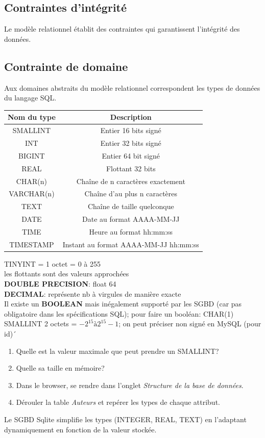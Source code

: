 \documentclass[a4paper,11pt]{article}
\begin{document}
\begin{Form}
\section{Contraintes d'intégrité}
Le modèle relationnel établit des contraintes qui garantissent l'intégrité des données.
\subsection{Contrainte de domaine}
Aux domaines abstraits du modèle relationnel correspondent les types de données du langage SQL.
\begin{center}
\begin{tabular}{|c|c|}
\hline 
\textbf{Nom du type} & \textbf{Description} \\ 
\hline 
SMALLINT & Entier 16 bits signé \\ 
\hline 
INT & Entier 32 bits signé \\ 
\hline 
BIGINT & Entier 64 bit signé \\ 
\hline 
REAL & Flottant 32 bits \\ 
\hline 
CHAR(n) & Chaîne de n caractères exactement \\ 
\hline 
VARCHAR(n) & Chaîne d'au plus n caractères \\ 
\hline 
TEXT & Chaîne de taille quelconque \\ 
\hline 
DATE & Date au format AAAA-MM-JJ \\ 
\hline 
TIME & Heure au format hh:mm:ss \\ 
\hline 
TIMESTAMP & Instant au format AAAA-MM-JJ hh:mm:ss \\ 
\hline 
\end{tabular}
\end{center}
\begin{commentprof}
TINYINT = 1 octet = 0 à 255\\
les flottants sont des valeurs approchées\\
\textbf{DOUBLE PRECISION}: float 64\\
\textbf{DECIMAL}: représente nb à virgules de manière exacte\\
Il existe un \textbf{BOOLEAN} mais inégalement supporté par les SGBD (car pas obligatoire dans les spécifications SQL); pour faire un booléan: CHAR(1)\\
SMALLINT 2 octets = $-2^{15} à 2^{15}-1$; on peut préciser non signé en MySQL (pour id)´
\end{commentprof}
\begin{activite}
\begin{enumerate}
\item Quelle est la valeur maximale que peut prendre un SMALLINT?
\item Quelle sa taille en mémoire?
\item Dans le browser, se rendre dans l'onglet \emph{Structure de la base de données}.
\item Dérouler la table \emph{Auteurs} et repérer les types de chaque attribut.
\end{enumerate}
\end{activite}
Le SGBD Sqlite simplifie les types (INTEGER, REAL, TEXT) en l'adaptant dynamiquement en fonction de la valeur stockée.

\end{Form}
\end{document}
